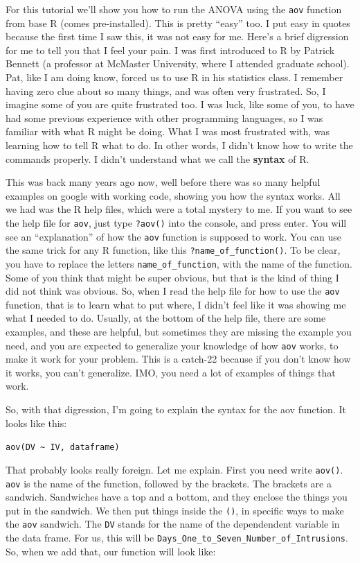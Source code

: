 \documentclass[]{book}
\theoremstyle{definition}
\theoremstyle{definition}
\theoremstyle{definition}
\theoremstyle{remark}
\begin{document}
For this tutorial we'll show you how to run the ANOVA using the
\texttt{aov} function from base R (comes pre-installed). This is pretty
``easy'' too. I put easy in quotes because the first time I saw this, it
was not easy for me. Here's a brief digression for me to tell you that I
feel your pain. I was first introduced to R by Patrick Bennett (a
professor at McMaster University, where I attended graduate school).
Pat, like I am doing know, forced us to use R in his statistics class. I
remember having zero clue about so many things, and was often very
frustrated. So, I imagine some of you are quite frustrated too. I was
luck, like some of you, to have had some previous experience with other
programming languages, so I was familiar with what R might be doing.
What I was most frustrated with, was learning how to tell R what to do.
In other words, I didn't know how to write the commands properly. I
didn't understand what we call the \textbf{syntax} of R.

This was back many years ago now, well before there was so many helpful
examples on google with working code, showing you how the syntax works.
All we had was the R help files, which were a total mystery to me. If
you want to see the help file for \texttt{aov}, just type
\texttt{?aov()} into the console, and press enter. You will see an
``explanation'' of how the \texttt{aov} function is supposed to work.
You can use the same trick for any R function, like this
\texttt{?name\_of\_function()}. To be clear, you have to replace the
letters \texttt{name\_of\_function}, with the name of the function. Some
of you think that might be super obvious, but that is the kind of thing
I did not think was obvious. So, when I read the help file for how to
use the \texttt{aov} function, that is to learn what to put where, I
didn't feel like it was showing me what I needed to do. Usually, at the
bottom of the help file, there are some examples, and these are helpful,
but sometimes they are missing the example you need, and you are
expected to generalize your knowledge of how \texttt{aov} works, to make
it work for your problem. This is a catch-22 because if you don't know
how it works, you can't generalize. IMO, you need a lot of examples of
things that work.

So, with that digression, I'm going to explain the syntax for the aov
function. It looks like this:

\texttt{aov(DV\ \textasciitilde{}\ IV,\ dataframe)}

That probably looks really foreign. Let me explain. First you need write
\texttt{aov()}. \texttt{aov} is the name of the function, followed by
the brackets. The brackets are a sandwich. Sandwiches have a top and a
bottom, and they enclose the things you put in the sandwich. We then put
things inside the \texttt{()}, in specific ways to make the \texttt{aov}
sandwich. The \texttt{DV} stands for the name of the dependendent
variable in the data frame. For us, this will be
\texttt{Days\_One\_to\_Seven\_Number\_of\_Intrusions}. So, when we add
that, our function will look like:
\end{document}
